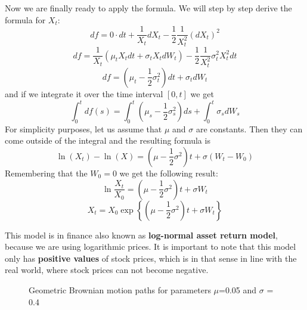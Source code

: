 \documentclass[times, utf8, diplomski]{fer}
\begin{document}
\noindent Now we are finally ready to apply the formula. We will step by step derive the formula for $X_t$:
\begin{equation*}
	df = 0\cdot dt + \frac{1}{X_t}dX_t - \frac{1}{2} \frac{1}{X_t^2}(dX_t)^2 
\end{equation*}
\begin{equation*}
	df = \frac{1}{X_t} (\mu_t X_t dt + \sigma_t X_t dW_t) - \frac{1}{2}\frac{1}{X_t^2}\sigma_t^2 X_t^2 dt
\end{equation*}
\begin{equation}
	df = (\mu_t - \frac{1}{2}\sigma_t^2)dt + \sigma_t dW_t
\end{equation}
and if we integrate it over the time interval $[0,t]$ we get
\begin{equation}
	\int_0^t df(s) = \int_0^t (\mu_s - \frac{1}{2}\sigma_s^2) ds + \int_0^t \sigma_s dW_s
\end{equation}
For simplicity purposes, let us assume that $\mu$ and $\sigma$ are constants. Then they can come outside of the integral and the resulting formula is
\begin{equation}
	\ln(X_t) - \ln(X) = (\mu-\frac{1}{2}\sigma^2)t + \sigma (W_t - W_0)
\end{equation}
Remembering that the $W_0 = 0$ we get the following result:
\begin{equation*}
	\ln\frac{X_t}{X_0} = (\mu-\frac{1}{2}\sigma^2)t + \sigma W_t
\end{equation*}
\begin{equation} \label{eqn_gbm}
	X_t = X_0\exp\left\{ (\mu-\frac{1}{2}\sigma^2)t + \sigma W_t \right\}
\end{equation}

\noindent This model is in finance also known as \textbf{log-normal asset return model}, because we are using logarithmic prices. It is important to note that this model only has \textbf{positive values} of stock prices, which is in that sense in line with the real world, where stock prices can not become negative. 

\vspace{1cm}
\begin{figure}[ht]
\centering
{}
\caption{Geometric Brownian motion paths for parameters $\mu$=0.05 and $\sigma$ = 0.4}
\label{fig:gbm_paths}
\end{figure}
\end{document}
